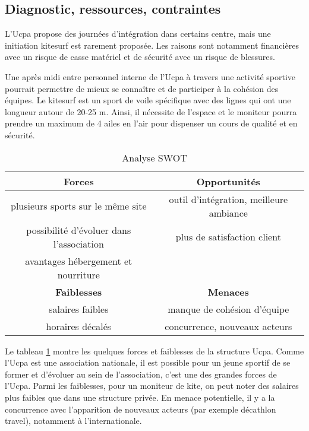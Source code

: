 \documentclass[11pt,a4paper]{report}
\begin{document}
\subsection{Diagnostic, ressources, contraintes}

L'Ucpa propose des journées d'intégration dans certains centre, mais
une initiation kitesurf est rarement proposée. Les raisons sont notamment
financières avec un risque de casse matériel et de sécurité avec un risque
de blessures.

Une après midi entre personnel interne de l'Ucpa à travers une 
activité sportive pourrait permettre  de mieux se connaître et de participer
à la cohésion des équipes.
Le kitesurf est un sport de voile spécifique avec des lignes  qui ont
une longueur autour de  20-25 m. Ainsi, il nécessite de l'espace
et le moniteur pourra prendre un maximum de 4 ailes en l'air
pour dispenser un cours de qualité et en sécurité. 

\begin{table}[h]
\centering
\begin{tabular}{|c|c|}
        \hline
        \textbf{Forces}                          & \textbf{Opportunités} \\ 
        \hline
        plusieurs sports sur le m\^eme site      &  outil d'intégration, meilleure ambiance\\
        possibilité d'évoluer dans l'association & plus de satisfaction client  \\
        avantages hébergement et nourriture      &                              \\
        \hline
        \textbf{Faiblesses}                      &  \textbf{Menaces} \\ 
        \hline
        salaires faibles                         & manque de cohésion d'équipe \\
        horaires décalés                         & concurrence, nouveaux acteurs   \\
        \hline
\end{tabular}
\caption{Analyse SWOT\label{swot}}
\end{table}
Le tableau \ref{swot} montre les quelques forces et faiblesses de la structure Ucpa.
Comme l'Ucpa est une association nationale, il est possible pour un jeune sportif
de se former et d'évoluer au sein de l'association, c'est une des grandes forces de l'Ucpa.
Parmi les faiblesses, pour un moniteur de kite, on peut noter des salaires plus
faibles que dans une structure privée. 
En menace potentielle, il y a  la concurrence avec 
l’apparition de nouveaux acteurs (par exemple décathlon travel), notamment
à l'internationale.
\end{document}
